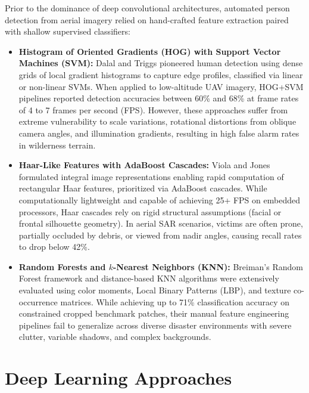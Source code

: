Prior to the dominance of deep convolutional architectures, automated person detection from aerial imagery relied on hand-crafted feature extraction paired with shallow supervised classifiers:
\begin{itemize}
    \item \textbf{Histogram of Oriented Gradients (HOG) with Support Vector Machines (SVM):} Dalal and Triggs \cite{5} pioneered human detection using dense grids of local gradient histograms to capture edge profiles, classified via linear or non-linear SVMs. When applied to low-altitude UAV imagery, HOG+SVM pipelines reported detection accuracies between 60\% and 68\% at frame rates of 4 to 7 frames per second (FPS). However, these approaches suffer from extreme vulnerability to scale variations, rotational distortions from oblique camera angles, and illumination gradients, resulting in high false alarm rates in wilderness terrain.
    \item \textbf{Haar-Like Features with AdaBoost Cascades:} Viola and Jones \cite{6} formulated integral image representations enabling rapid computation of rectangular Haar features, prioritized via AdaBoost cascades. While computationally lightweight and capable of achieving 25+ FPS on embedded processors, Haar cascades rely on rigid structural assumptions (facial or frontal silhouette geometry). In aerial SAR scenarios, victims are often prone, partially occluded by debris, or viewed from nadir angles, causing recall rates to drop below 42\%.
    \item \textbf{Random Forests and $k$-Nearest Neighbors (KNN):} Breiman's Random Forest framework \cite{7} and distance-based KNN algorithms were extensively evaluated using color moments, Local Binary Patterns (LBP), and texture co-occurrence matrices. While achieving up to 71\% classification accuracy on constrained cropped benchmark patches, their manual feature engineering pipelines fail to generalize across diverse disaster environments with severe clutter, variable shadows, and complex backgrounds.
\end{itemize}

\section{Deep Learning Approaches}

